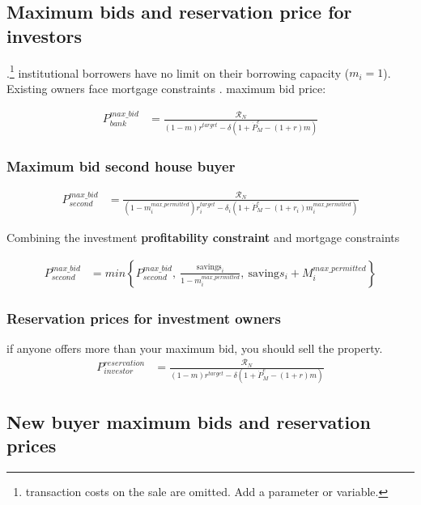 \subsection{Maximum bids and reservation price for investors}.\footnote{transaction costs on the sale are omitted. Add a parameter or variable.}
institutional borrowers have no limit on their borrowing capacity ($m_i=1$). Existing owners face mortgage constraints .
maximum bid price:

\begin{eqnarray}\label{eqn-max-investment-bid}
P_{bank}^{max\_bid} & = \frac{\mathcal{R}_N}{(1-m)r^{target}-\delta \left(1 + \dot P_M^e - (1+r)m\right)} 
\end{eqnarray}


\subsubsection{Maximum bid second house buyer}

\begin{eqnarray}\label{eqn-max-second-bid}
P_{second}^{max\_bid} & = \frac{\mathcal{R}_N}{(1-m_i^{max\_permitted})r_i^{target}-\delta_i \left(1 + \dot P_M^e - (1+r_i)m_i^{max\_permitted}\right)}  \nonumber
\end{eqnarray}

Combining the investment \textbf{profitability constraint} and mortgage constraints

\begin{eqnarray}
P_{second}^{max\_bid} & = min \left\{P_{second}^{max\_bid},\ \frac{\mathrm{savings}_i}{1-m_i^{max\_permitted}},\ \mathrm{saving}s_i + M_i^{max\_permitted}  \right\}  \nonumber
\end{eqnarray}

\subsubsection{Reservation prices for investment owners}
 if anyone offers more than your maximum bid, you should sell the property. 
\begin{eqnarray}
P_{investor}^{reservation} & =    \frac{\mathcal{R}_N}{(1-m)r^{target}-\delta \left(1 + \dot P_M^e - (1+r)m\right)}  \nonumber\end{eqnarray}


\subsection{New buyer maximum bids and reservation prices }

